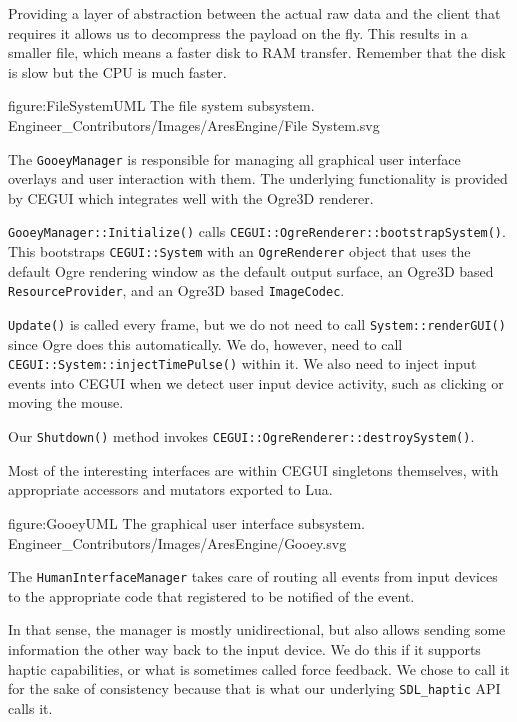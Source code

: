 \item
Providing a layer of abstraction between the actual raw data and the client that requires it allows us to decompress the payload on the fly. This results in a smaller file, which means a faster disk to RAM transfer. Remember that the disk is slow but the CPU is much faster.

\stopitemize

\FullPageDiagram
    {figure:FileSystemUML}
    {The file system subsystem.}
    {Engineer_Contributors/Images/AresEngine/File System.svg}

\page 
{}
The {\tt GooeyManager} is responsible for managing all graphical user interface overlays and user interaction with them. The underlying functionality is provided by CEGUI which integrates well with the Ogre3D renderer.

{\tt GooeyManager::Initialize()} calls {\tt CEGUI::OgreRenderer::bootstrapSystem()}. This bootstraps {\tt CEGUI::System} with an {\tt OgreRenderer} object that uses the default Ogre rendering window as the default output surface, an Ogre3D based {\tt ResourceProvider}, and an Ogre3D based {\tt ImageCodec}.

{\tt Update()} is called every frame, but we do not need to call {\tt System::renderGUI()} since Ogre does this automatically. We do, however, need to call {\tt CEGUI::System::injectTimePulse()} within it. We also need to inject input events into CEGUI when we detect user input device activity, such as clicking or moving the mouse.

Our {\tt Shutdown()} method invokes {\tt CEGUI::OgreRenderer::destroySystem()}.

Most of the interesting interfaces are within CEGUI singletons themselves, with appropriate accessors and mutators exported to Lua.

\FullPageDiagram
    {figure:GooeyUML}
    {The graphical user interface subsystem.}
    {Engineer_Contributors/Images/AresEngine/Gooey.svg}

\page 
{}
The {\tt HumanInterfaceManager} takes care of routing all events from input devices to the appropriate code that registered to be notified of the event. 

In that sense, the manager is mostly unidirectional, but also allows sending some information the other way back to the input device. We do this if it supports haptic capabilities, or what is sometimes called force feedback. We chose to call it  for the sake of consistency because that is what our underlying {\tt SDL_haptic} API calls it.

